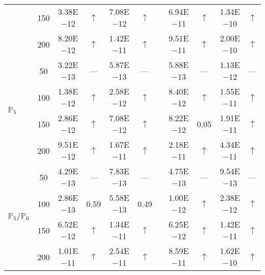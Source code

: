 \begin{table}[H]
{\begin{tabular}{@{}l c c c c c c c c c c@{}}
 & 150 & 3.38E$-$12 & $\uparrow$  & 7.08E$-$12 & $\uparrow$ &  & 6.94E$-$11 & $\uparrow$ & 1.34E$-$10 & $\uparrow$\\
 & 200 & 8.20E$-$12 & $\uparrow$  & 1.42E$-$11 & $\uparrow$ &  & 9.51E$-$11 & $\uparrow$ & 2.00E$-$10 & $\uparrow$\\
\midrule
\multirow{4}{*}{$\mathbb{P}_{5}$}
 & 50 & 3.22E$-$13 & ---  & 5.87E$-$13 & --- &  & 5.88E$-$13 & --- & 1.13E$-$12 & ---\\
 & 100 & 1.38E$-$12 & $\uparrow$  & 2.58E$-$12 & $\uparrow$ &  & 8.40E$-$12 & $\uparrow$ & 1.55E$-$11 & $\uparrow$\\
 & 150 & 2.86E$-$12 & $\uparrow$  & 7.08E$-$12 & $\uparrow$ &  & 8.22E$-$12 & 0.05 & 1.91E$-$11 & $\uparrow$\\
 & 200 & 9.51E$-$12 & $\uparrow$  & 1.67E$-$11 & $\uparrow$ &  & 2.18E$-$11 & $\uparrow$ & 4.34E$-$11 & $\uparrow$\\
\midrule
\multirow{4}{*}{$\mathbb{P}_{5}/\mathbb{P}_{6}$}
 & 50 & 4.29E$-$13 & ---  & 7.83E$-$13 & --- &  & 4.75E$-$13 & --- & 9.54E$-$13 & ---\\
 & 100 & 2.86E$-$13 & 0.59  & 5.58E$-$13 & 0.49 &  & 1.00E$-$12 & $\uparrow$ & 2.38E$-$12 & $\uparrow$\\
 & 150 & 6.52E$-$12 & $\uparrow$  & 1.34E$-$11 & $\uparrow$ &  & 6.25E$-$12 & $\uparrow$ & 1.42E$-$11 & $\uparrow$\\
 & 200 & 1.01E$-$11 & $\uparrow$  & 2.54E$-$11 & $\uparrow$ &  & 8.59E$-$11 & $\uparrow$ & 1.62E$-$10 & $\uparrow$\\
\bottomrule
\end{tabular}}
\label{none}
\end{table}

